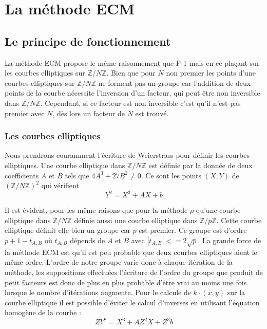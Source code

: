 \documentclass[10pt,a4paper]{report}
\begin{document}
\section{La méthode ECM}

\subsection{Le principe de fonctionnement}

	La méthode ECM propose le même raisonnement que P-1 mais en ce plaçant sur les courbes elliptiques sur $\mathbb{Z}/N\mathbb{Z}$. Bien que pour $N$ non premier les points d'une courbes elliptiques sur $\mathbb{Z}/N\mathbb{Z}$ ne forment pas un groupe car l'addition de deux points de la courbe nécessite l'inversion d'un facteur, qui peut être non inversible dans $\mathbb{Z}/N\mathbb{Z}$. Cependant, si ce facteur est non inversible c'est qu'il n'est pas premier avec $N$, dès lors un facteur de $N$ est trouvé. 
	
	\subsubsection{Les courbes elliptiques}
	
	Nous prendrons couramment l'écriture de Weierstrass pour définir les courbes elliptiques. Une courbe elliptique dans $\mathbb{Z}/N\mathbb{Z}$ est définie par la donnée de deux coefficients $A$ et $B$ tels que $4A^3+27B^2 \ne 0$. Ce sont les points $(X,Y)$ de $(\mathbb{Z}/N\mathbb{Z})^2$ qui vérifient
\begin{equation}
	Y^2 = X^3 + A X +b
\end{equation}

	Il est évident, pour les même raisons que pour la méthode $\rho$ qu'une courbe elliptique dans $\mathbb{Z}/N\mathbb{Z}$ définie aussi une courbe elliptique dans $\mathbb{Z}/p\mathbb{Z}$. Cette courbe elliptique définit elle bien un groupe car $p$ est premier. Ce groupe est d'ordre $p+1-t_{A,B}$ où $t_{A,B}$ dépends de $A$ et $B$ avec $|t_{A,B}| <= 2 \sqrt{p}$. La grande force de la méthode ECM est qu'il est peu probable que deux courbes elliptiques aient le même ordre. L'ordre de notre groupe varie donc à chaque itération de la méthode, les suppositions effectuées l'écriture de l'ordre du groupe que produit de petit facteurs est donc de plus en plus probable d'être vrai au moins une fois lorsque le nombre d'itérations augmente. Pour le calcule de $k \cdot (x,y) $ sur la courbe elliptique il est possible d'éviter le calcul d'inverses en utilisant l'équation homogène de la courbe :
\begin{equation}
	Z Y^2 = X^3 + A Z ^2 X + Z^3 b
\end{equation}
\end{document}
